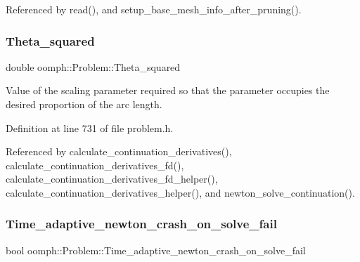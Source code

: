 Referenced by read(), and setup\+\_\+base\+\_\+mesh\+\_\+info\+\_\+after\+\_\+pruning().

\mbox{\label{classoomph_1_1Problem_a123843ca2ed6384342939ef2b19477ef}} 
\subsubsection{\texorpdfstring{Theta\+\_\+squared}{Theta\_squared}}
{\footnotesize\ttfamily double oomph\+::\+Problem\+::\+Theta\+\_\+squared\hspace{0.3cm}{\ttfamily [protected]}}



Value of the scaling parameter required so that the parameter occupies the desired proportion of the arc length. 



Definition at line 731 of file problem.\+h.



Referenced by calculate\+\_\+continuation\+\_\+derivatives(), calculate\+\_\+continuation\+\_\+derivatives\+\_\+fd(), calculate\+\_\+continuation\+\_\+derivatives\+\_\+fd\+\_\+helper(), calculate\+\_\+continuation\+\_\+derivatives\+\_\+helper(), and newton\+\_\+solve\+\_\+continuation().

\mbox{\label{classoomph_1_1Problem_a3e9aecf88bde320bc2d169b5f3c99fee}} 
\subsubsection{\texorpdfstring{Time\+\_\+adaptive\+\_\+newton\+\_\+crash\+\_\+on\+\_\+solve\+\_\+fail}{Time\_adaptive\_newton\_crash\_on\_solve\_fail}}
{\footnotesize\ttfamily bool oomph\+::\+Problem\+::\+Time\+\_\+adaptive\+\_\+newton\+\_\+crash\+\_\+on\+\_\+solve\+\_\+fail\hspace{0.3cm}{\ttfamily [protected]}}



